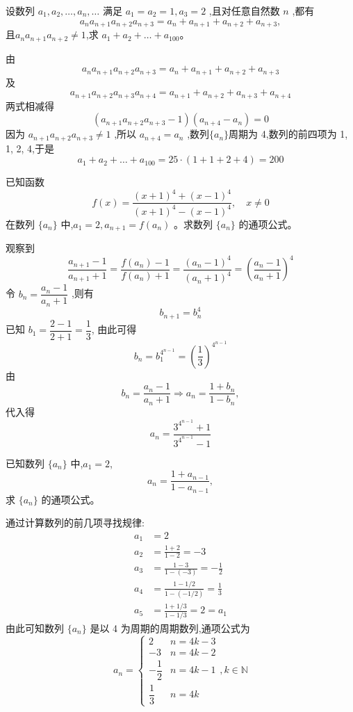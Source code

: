 \begin{questions}
    \question 设数列 $a_1, a_2, \dots, a_n, \dots$ 满足 $a_1 = a_2 = 1, a_3 = 2$ ,且对任意自然数 $n$ ,都有 
    \[
    a_n  a_{n+1}  a_{n+2}  a_{n+3} = a_n + a_{n+1} + a_{n+2} + a_{n+3},
    \]
    且$a_n  a_{n+1}  a_{n+2} \neq 1$,求 $a_1 + a_2 + \dots + a_{100}$。
    \begin{solution}
        由 
        \[
        a_n a_{n+1} a_{n+2} a_{n+3} = a_n + a_{n+1} + a_{n+2} + a_{n+3}
        \]
        及 
        \[
        a_{n+1} a_{n+2} a_{n+3} a_{n+4} = a_{n+1} + a_{n+2} + a_{n+3} + a_{n+4}
        \]
        两式相减得 
        \[
        (a_{n+1} a_{n+2} a_{n+3} - 1)(a_{n+4} - a_n) = 0
        \]
        因为 $a_{n+1} a_{n+2} a_{n+3} \neq 1$ ,所以 $a_{n+4} = a_n$ ,数列$\{a_n\}$周期为 4,数列的前四项为 1, 1, 2, 4,于是
        \[ 
        a_1 + a_2 + \dots + a_{100} = 25 \cdot (1 + 1 + 2 + 4) = 200 
        \]
    \end{solution}

    \question 已知函数 
    \[
    f(x) = \frac{(x+1)^4 + (x-1)^4}{(x+1)^4 - (x-1)^4},\quad x \neq 0
    \]
    在数列 $\{a_n\}$ 中,$a_1 = 2,a_{n+1} = f(a_n)$ 。求数列 $\{a_n\}$ 的通项公式。
    \begin{solution}
        观察到
        \[ 
        \frac{a_{n+1}-1}{a_{n+1}+1} = \frac{f(a_n)-1}{f(a_n)+1} = \frac{(a_n-1)^4}{(a_n+1)^4} = \left( \frac{a_n-1}{a_n+1} \right)^4 
        \]
        令 $b_n = \dfrac{a_n - 1}{a_n + 1}$ ,则有 
        \[
        b_{n+1} = b_n^4
        \]
        已知 $b_1 = \dfrac{2-1}{2+1} = \dfrac{1}{3}$,
        由此可得 
        \[
        b_n = b_1^{4^{n-1}} = \left( \frac{1}{3} \right)^{4^{n-1}}
        \]
        由 
        \[
        b_n = \frac{a_n - 1}{a_n + 1} \Rightarrow a_n = \frac{1+b_n}{1-b_n},
        \]
        代入得
        \[ 
        a_n = \frac{3^{4^{n-1}} + 1}{3^{4^{n-1}} - 1} 
        \]
    \end{solution}

    \question 已知数列 $\{a_n\}$ 中,$a_1 = 2$,
    \[
    a_n = \frac{1+a_{n-1}}{1-a_{n-1}},
    \]
    求 $\{a_n\}$ 的通项公式。
    \begin{solution}
        通过计算数列的前几项寻找规律:
        \begin{align*}
        a_1 &= 2\\
        a_2 &= \frac{1+2}{1-2} = -3 \\
        a_3 &= \frac{1-3}{1-(-3)} = -\frac{1}{2}\\
        a_4 &= \frac{1-1/2}{1-(-1/2)} = \frac{1}{3}\\ 
        a_5 &= \frac{1+1/3}{1-1/3} = 2 = a_1 
        \end{align*}
        由此可知数列 $\{a_n\}$ 是以 4 为周期的周期数列,通项公式为
        \[ 
        a_n = 
        \begin{cases} 
        2 & n = 4k-3 \\ 
        -3 & n = 4k-2 \\[4pt]
        -\dfrac{1}{2} & n = 4k-1 \\[8pt]
        \dfrac{1}{3} & n = 4k 
        \end{cases} ,k \in \mathbb{N}
        \]
    \end{solution}


\end{questions}
